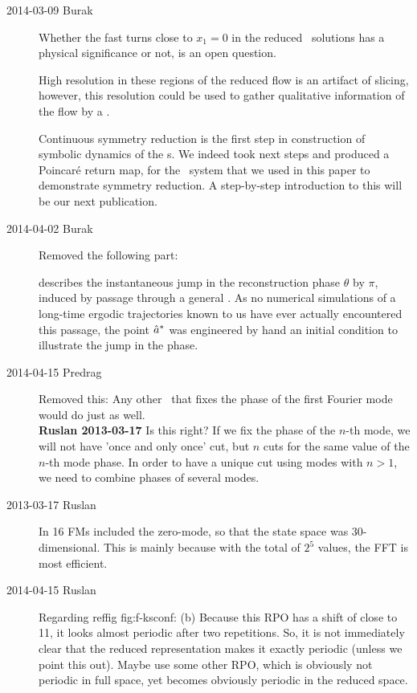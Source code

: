 \begin{description}

\item[2014-03-09 Burak] Whether the fast turns close to $x_1 = 0$  in
    the reduced \KS\ solutions has a physical significance or not, is
    an open question.

High resolution in these regions of the reduced flow is an artifact of
slicing, however, this resolution could be used to gather qualitative
information of the flow by a \PoincSec.

Continuous symmetry reduction is the first step in construction of
symbolic dynamics of the \rpo s. We indeed took next steps and produced a
Poincar\'e return map, for the \twomode\ system that we used in this
paper to demonstrate symmetry reduction. A step-by-step introduction to
this will be our next publication.


\item[2014-04-02 Burak] Removed the following part:

 describes the instantaneous
jump in the reconstruction phase $\theta$ by $\pi$, induced by passage
through a general {\sliceBord}. As no numerical simulations of a
long-time ergodic trajectories known to us have ever actually encountered
this passage, the {\chartBord} point $\hat{a}^*$ was engineered by hand
an initial condition to illustrate the jump in the phase.

\item[2014-04-15 Predrag] Removed this:
Any other \template\ that fixes the phase of the first Fourier mode would do just
as well.
\\{\bf Ruslan 2013-03-17} Is this right? If we fix the phase of the $n$-th
    mode, we will not have 'once and only once' cut, but $n$ cuts for the
    same value of the $n$-th mode phase.  In order to have a unique cut
    using modes with $n > 1$, we need to combine phases of several
    modes.

\item[2013-03-17 Ruslan] In  16 FMs included the zero-mode, so that
the state space was 30-dimensional.  This is mainly because with
the total of $2^5$ values, the FFT is most efficient.

\item[2014-04-15 Ruslan]
Regarding  reffig {fig:f-ksconf}:
(b) Because this RPO has a shift of close to 11, it
looks almost periodic after two repetitions.  So, it is not immediately
clear that the reduced representation makes it exactly periodic (unless
we point this out).  Maybe use some other RPO, which is obviously not
periodic in full space, yet becomes obviously periodic in the reduced
space.


\end{description}
